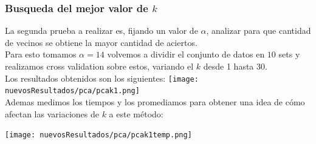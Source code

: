 \subsubsection{Busqueda del mejor valor de $k$}

La segunda prueba a realizar es, fijando un valor de $\alpha$, analizar para que cantidad de vecinos se obtiene la mayor cantidad de aciertos.
\\
Para esto tomamos $\alpha = 14$ volvemos a dividir el conjunto de datos en $10$ sets y realizamos cross validation sobre estos, variando el $k$ desde 1 hasta $30$.
\\
Los resultados obtenidos son los siguientes:
\texttt{[image: nuevosResultados/pca/pcak1.png]}\\

Ademas medimos los tiempos y los promediamos para obtener una idea de cómo afectan las variaciones de $k$ a este método:

\texttt{[image: nuevosResultados/pca/pcak1temp.png]}\\




